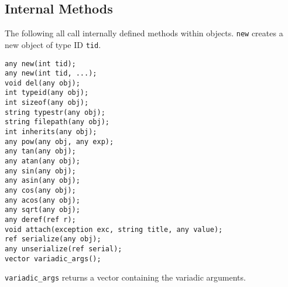 \documentclass[10pt,a4paper]{article}
\begin{document}
\subsection{Internal Methods}
\label{sec:internalMethods}
The following all call internally defined methods within objects. \verb|new| creates a new object of type ID \verb|tid|.
\begin{verbatim}
any new(int tid);
any new(int tid, ...);
void del(any obj);
int typeid(any obj);
int sizeof(any obj);
string typestr(any obj);
string filepath(any obj);
int inherits(any obj);
any pow(any obj, any exp);
any tan(any obj);
any atan(any obj);
any sin(any obj);
any asin(any obj);
any cos(any obj);
any acos(any obj);
any sqrt(any obj);
any deref(ref r);
void attach(exception exc, string title, any value);
ref serialize(any obj);
any unserialize(ref serial);
vector variadic_args();
\end{verbatim}

\verb|variadic_args| returns a vector containing the variadic arguments. 
\end{document}
